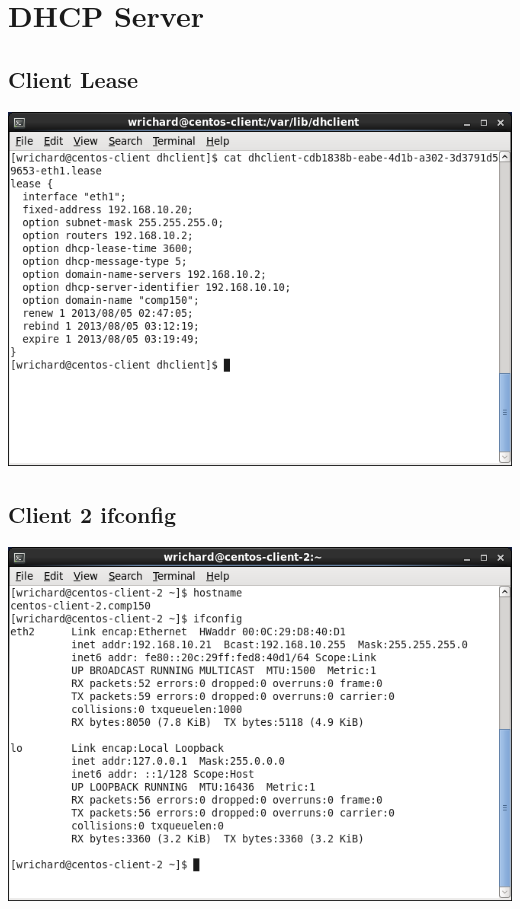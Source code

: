 \documentclass[a4paper,10pt]{article}
\begin{document}
\section{DHCP Server}
\subsection{Client Lease}
  \begin{center}
  \includegraphics[width=\linewidth]{./clone-lease.png}
  \end{center}
\subsection{Client 2 ifconfig}
  \begin{center}
  \includegraphics[width=\linewidth]{./centos-client-2-ifconfig.png}
  \end{center}
\end{document}
